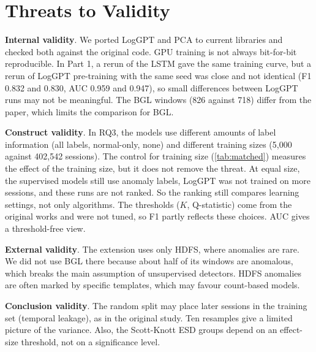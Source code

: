 \documentclass[10pt, conference]{IEEEtran}
\renewcommand{\paragraph}[1]{\noindent\textbf{#1}.}
\begin{document}
\section{Threats to Validity}
\label{sec:threats}

\paragraph{Internal validity} We ported LogGPT and PCA to current libraries and checked both against the original code. GPU training is not always bit-for-bit reproducible. In Part 1, a rerun of the LSTM gave the same training curve, but a rerun of LogGPT pre-training with the same seed was close and not identical (F1 0.832 and 0.830, AUC 0.959 and 0.947), so small differences between LogGPT runs may not be meaningful. The BGL windows (826 against 718) differ from the paper, which limits the comparison for BGL.

\paragraph{Construct validity} In RQ3, the models use different amounts of label information (all labels, normal-only, none) and different training sizes (5,000 against 402,542 sessions). The control for training size (\cref{tab:matched}) measures the effect of the training size, but it does not remove the threat. At equal size, the supervised models still use anomaly labels, LogGPT was not trained on more sessions, and these runs are not ranked. So the ranking still compares learning settings, not only algorithms. The thresholds ($K$, Q-statistic) come from the original works and were not tuned, so F1 partly reflects these choices. AUC gives a threshold-free view.

\paragraph{External validity} The extension uses only HDFS, where anomalies are rare. We did not use BGL there because about half of its windows are anomalous, which breaks the main assumption of unsupervised detectors. HDFS anomalies are often marked by specific templates, which may favour count-based models.

\paragraph{Conclusion validity} The random split may place later sessions in the training set (temporal leakage), as in the original study. Ten resamples give a limited picture of the variance. Also, the Scott-Knott ESD groups depend on an effect-size threshold, not on a significance level.
\end{document}

